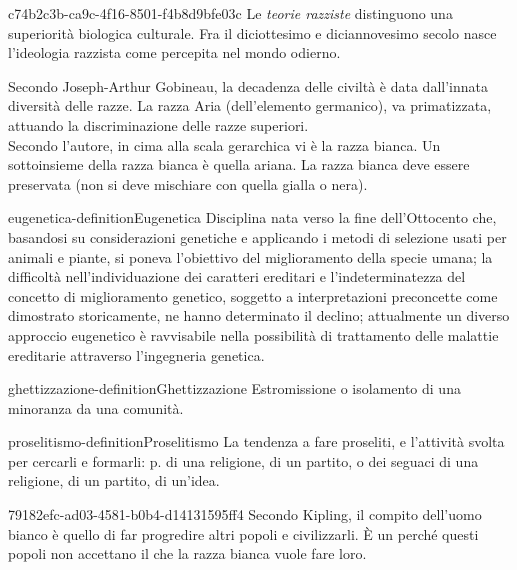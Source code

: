 \documentclass[preview]{standalone}
\begin{document}
\begin{snippet}{c74b2c3b-ca9c-4f16-8501-f4b8d9bfe03c}
    Le \textit{teorie razziste} distinguono una superiorità biologica culturale.
    Fra il diciottesimo e diciannovesimo secolo nasce l'ideologia razzista come percepita nel mondo odierno.

    Secondo Joseph-Arthur Gobineau, la decadenza delle civiltà è data dall'innata
    diversità delle razze. La razza Aria (dell'elemento germanico),
    va primatizzata, attuando la discriminazione delle razze superiori.\\
    Secondo l'autore, in cima alla scala gerarchica vi è la razza bianca.
    Un sottoinsieme della razza bianca è quella ariana.
    La razza bianca deve essere preservata (non si deve mischiare con quella gialla o nera).
\end{snippet}

\begin{snippetdefinition}{eugenetica-definition}{Eugenetica}
    Disciplina nata verso la fine dell'Ottocento che, basandosi su considerazioni genetiche e applicando i metodi di selezione usati per animali e piante, si poneva l'obiettivo del miglioramento della specie umana; la difficoltà nell'individuazione dei caratteri ereditari e l'indeterminatezza del concetto di miglioramento genetico, soggetto a interpretazioni preconcette come dimostrato storicamente, ne hanno determinato il declino; attualmente un diverso approccio eugenetico è ravvisabile nella possibilità di trattamento delle malattie ereditarie attraverso l'ingegneria genetica.
\end{snippetdefinition}

\begin{snippetdefinition}{ghettizzazione-definition}{Ghettizzazione}
    Estromissione o isolamento di una minoranza da una comunità.
\end{snippetdefinition}

\begin{snippetdefinition}{proselitismo-definition}{Proselitismo}
    La tendenza a fare proseliti, e l'attività svolta per cercarli e formarli: p. di una religione, di un partito, o dei seguaci di una religione, di un partito, di un'idea.
\end{snippetdefinition}

\begin{snippet}{79182efc-ad03-4581-b0b4-d14131595ff4}
    Secondo Kipling, il compito dell'uomo bianco è quello di far progredire
    altri popoli e civilizzarli. È un 
    perché questi popoli non accettano il  che la razza bianca vuole fare loro.
\end{snippet}
\end{document}
